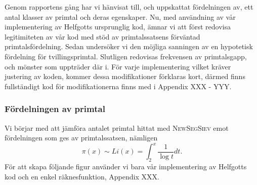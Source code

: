 


Genom rapportens gång har vi hänvisat till, och uppskattat fördelningen av, ett antal klasser av primtal och deras egenskaper. 
Nu, med användning av vår implementering av Helfgotts ursprunglig kod, ämnar vi att först redovisa legitimiteten av vår kod med stöd av primtalssatsens förväntad primtalsfördelning. 
Sedan undersöker vi den möjliga sanningen av en hypotetisk fördelning för tvillingsprimtal. 
Slutligen redovisas frekvensen av primtalsgapp, och mönster som uppträder där i.
För varje implementering vilket kräver justering av koden, kommer dessa modifikationer förklaras kort, därmed finns fullständigt kod för modifikationerna finns med i Appendix XXX - YYY.

\subsubsection{Fördelningen av primtal}\label{app.primes.title}

Vi börjar med att jämföra antalet primtal hittat med \textsc{NewSegSiev} emot fördelningen som ges av primtalssatsen, nämligen
\begin{equation}
    \pi(x) \sim Li(x) = \int_2^x\frac{1}{\log t}dt\label{app.primes.PNT}.
\end{equation}
För att skapa följande figur använder vi bara vår implementering av Helfgotts kod och en enkel räknesfunktion, Appendix XXX.

